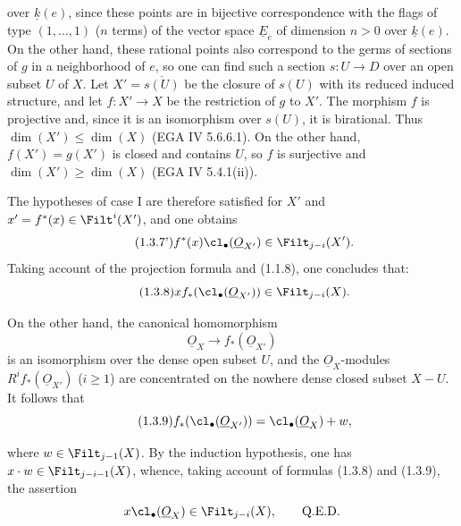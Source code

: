 over $\underline{k}(e)$, since these points are in bijective correspondence with the flags of type $(1,\ldots,1)$ ($n$ terms) of the vector space $\underline{E}_e$ of dimension $n>0$ over $\underline{k}(e)$. On the other hand, these rational points also correspond to the germs of sections of $g$ in a neighborhood of $e$, so one can find such a section $s:U\to D$ over an open subset $U$ of $X$. Let $X'=\overline{s(U)}$ be the closure of $s(U)$ with its reduced induced structure, and let $f:X'\to X$ be the restriction of $g$ to $X'$. The morphism $f$ is projective and, since it is an isomorphism over $s(U)$, it is birational.
Thus $\dim(X')\leq\dim(X)$ (EGA IV 5.6.6.1). On the other hand, $f(X')=g(X')$ is closed and contains $U$, so $f$ is surjective and $\dim(X')\geq\dim(X)$ (EGA IV 5.4.1(ii)).

The hypotheses of case I are therefore satisfied for $X'$ and $x'=f^*(x)\in\Filt^i(X')$, and one obtains
\begin{equation}\tag{1.3.7'}
f^*(x)\cl_\bullet(\underline{O}_{X'})\in\Filt_{j-i}(X').
\end{equation}
Taking account of the projection formula and (1.1.8), one concludes that:
\begin{equation}\tag{1.3.8}
x f_*(\cl_\bullet(\underline{O}_{X'}))\in\Filt_{j-i}(X).
\end{equation}

On the other hand, the canonical homomorphism
\[
\underline{O}_X\longrightarrow f_*(\underline{O}_{X'})
\]
is an isomorphism over the dense open subset $U$, and the $\underline{O}_X$-modules $R^if_*(\underline{O}_{X'})$ ($i\geq1$) are concentrated on the nowhere dense closed subset $X-U$. It follows that
\begin{equation}\tag{1.3.9}
f_*(\cl_\bullet(\underline{O}_{X'}))=\cl_\bullet(\underline{O}_X)+w,

\end{equation}
%

where $w\in\Filt_{j-1}(X)$. By the induction hypothesis, one has $x\cdot w\in\Filt_{j-i-1}(X)$, whence, taking account of formulas (1.3.8) and (1.3.9), the assertion
\[
x\cl_\bullet(\underline{O}_X)\in\Filt_{j-i}(X),\qquad\text{Q.E.D.}
\]

